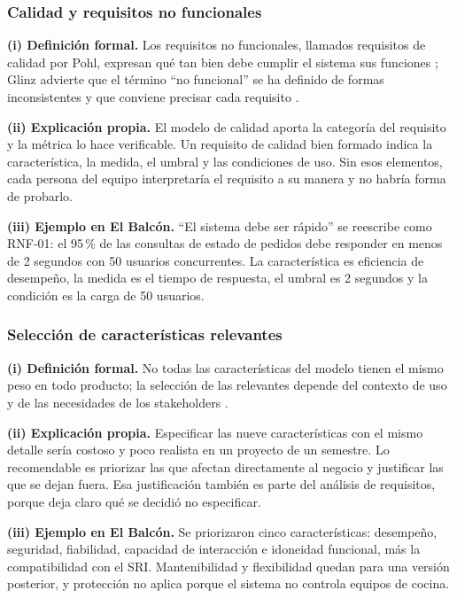 \subsubsection{Calidad y requisitos no funcionales}
\textbf{(i) Definici\'on formal.} Los requisitos no funcionales, llamados requisitos de calidad por Pohl, expresan qu\'e tan bien debe cumplir el sistema sus funciones \cite{pohl2025}; Glinz advierte que el t\'ermino ``no funcional'' se ha definido de formas inconsistentes y que conviene precisar cada requisito \cite{glinz2007}.\par
\textbf{(ii) Explicaci\'on propia.} El modelo de calidad aporta la categor\'ia del requisito y la m\'etrica lo hace verificable. Un requisito de calidad bien formado indica la caracter\'istica, la medida, el umbral y las condiciones de uso. Sin esos elementos, cada persona del equipo interpretar\'ia el requisito a su manera y no habr\'ia forma de probarlo.\par
\textbf{(iii) Ejemplo en El Balc\'on.} ``El sistema debe ser r\'apido'' se reescribe como RNF-01: el 95\,\% de las consultas de estado de pedidos debe responder en menos de 2 segundos con 50 usuarios concurrentes. La caracter\'istica es eficiencia de desempe\~no, la medida es el tiempo de respuesta, el umbral es 2 segundos y la condici\'on es la carga de 50 usuarios.\par

\subsubsection{Selecci\'on de caracter\'isticas relevantes}
\textbf{(i) Definici\'on formal.} No todas las caracter\'isticas del modelo tienen el mismo peso en todo producto; la selecci\'on de las relevantes depende del contexto de uso y de las necesidades de los stakeholders \cite{iso25010}. %
\par
\textbf{(ii) Explicaci\'on propia.} Especificar las nueve caracter\'isticas con el mismo detalle ser\'ia costoso y poco realista en un proyecto de un semestre. Lo recomendable es priorizar las que afectan directamente al negocio y justificar las que se dejan fuera. Esa justificaci\'on tambi\'en es parte del an\'alisis de requisitos, porque deja claro qu\'e se decidi\'o no especificar.\par
\textbf{(iii) Ejemplo en El Balc\'on.} Se priorizaron cinco caracter\'isticas: desempe\~no, seguridad, fiabilidad, capacidad de interacci\'on e idoneidad funcional, m\'as la compatibilidad con el SRI. Mantenibilidad y flexibilidad quedan para una versi\'on posterior, y protecci\'on no aplica porque el sistema no controla equipos de cocina.\par
